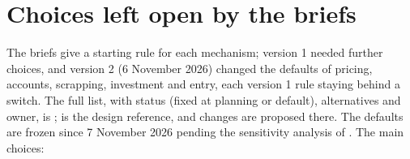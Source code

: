 \section{Choices left open by the briefs}\label{sec:choices}

The briefs give a starting rule for each mechanism; version 1 needed further choices, and
version 2 (6 November 2026) changed the defaults of pricing, accounts, scrapping,
investment and entry, each version 1 rule staying behind a switch. The full list, with
status (fixed at planning or default), alternatives and owner, is
;  is the design reference, and changes are
proposed there. The defaults are frozen since 7 November 2026 pending the sensitivity
analysis of . The main choices:

